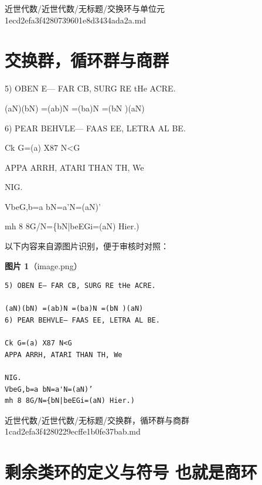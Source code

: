 \begin{note}[来源路径]

近世代数/近世代数/无标题/交换环与单位元 1ecd2efa3f4280739601e8d3434ada2a.md

\end{note}

\section*{交换群，循环群与商群}

\begin{note}

5) OBEN E— FAR CB, SURG RE tHe ACRE.

(aN)(bN) =(ab)N =(ba)N =(bN )(aN)

6) PEAR BEHVLE— FAAS EE, LETRA AL BE.

Ck G=(a) X87 N<G

APPA ARRH, ATARI THAN TH, We

NIG.

VbeG,b=a bN=a'N=(aN)’

mh 8 8G/N=\{bN|beEGi=(aN) Hier.)

\end{note}

\begin{note}
以下内容来自源图片识别，便于审核时对照：

\textbf{图片 1}（image.png）
\begin{Verbatim}[fontsize=\small]
5) OBEN E— FAR CB, SURG RE tHe ACRE.

(aN)(bN) =(ab)N =(ba)N =(bN )(aN)
6) PEAR BEHVLE— FAAS EE, LETRA AL BE.

Ck G=(a) X87 N<G
APPA ARRH, ATARI THAN TH, We

NIG.
VbeG,b=a bN=a'N=(aN)’
mh 8 8G/N={bN|beEGi=(aN) Hier.)
\end{Verbatim}

\end{note}

\begin{note}[来源路径]

近世代数/近世代数/无标题/交换群，循环群与商群 1cad2efa3f4280229ecffe1b0fe37bab.md

\end{note}

\section*{剩余类环的定义与符号 也就是商环}

